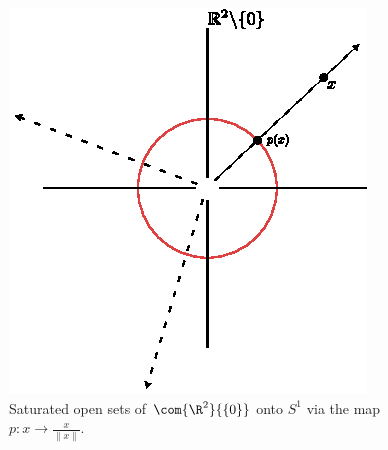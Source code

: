 \begin{example}
\begin{enumerate}
            \begin{figure}[h]
                \centering
                \includegraphics[scale = 1.0]{Figures/Chapter2/saturated_rays.eps}
                \caption{Saturated open sets of $\com{\R^2}{\{0\}}$ onto $S^1$
                via the map  $p:x \rightarrow \frac{x}{\|x\|}$.}
                \label{fig_2.4}
            \end{figure}
    \end{enumerate}
\end{example}

